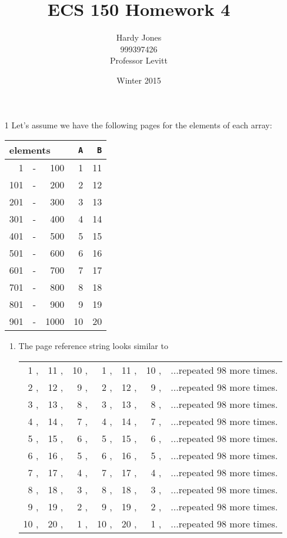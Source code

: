 \documentclass[12pt,letterpaper]{article}
\title{ECS 150 Homework 4\vspace{-2ex}}
\author{Hardy Jones\\
        999397426\\
        Professor Levitt\vspace{-2ex}}
\date{Winter 2015}
\begin{document}
  \maketitle

  \begin{enumerate}
    \item [1]
      Let's assume we have the following pages for the elements of each array:

      \begin{tabular}{r c r | r | r |}
        \multicolumn{3}{l|}{elements} & \texttt{A} & \texttt{B} \\
        \hline
        1   & - & 100  & 1          & 11 \\
        \hline
        101 & - & 200  & 2          & 12 \\
        \hline
        201 & - & 300  & 3          & 13 \\
        \hline
        301 & - & 400  & 4          & 14 \\
        \hline
        401 & - & 500  & 5          & 15 \\
        \hline
        501 & - & 600  & 6          & 16 \\
        \hline
        601 & - & 700  & 7          & 17 \\
        \hline
        701 & - & 800  & 8          & 18 \\
        \hline
        801 & - & 900  & 9          & 19 \\
        \hline
        901 & - & 1000 & 10         & 20 \\
        \hline
      \end{tabular}

      \begin{enumerate}
        \item The page reference string looks similar to

          \begin{tabular}{r r r r r r p{5cm}}
            1  ,& 11 ,& 10 ,& 1  ,& 11 ,& 10 ,& ...repeated 98 more times. \\
            2  ,& 12 ,& 9  ,& 2  ,& 12 ,& 9  ,& ...repeated 98 more times. \\
            3  ,& 13 ,& 8  ,& 3  ,& 13 ,& 8  ,& ...repeated 98 more times. \\
            4  ,& 14 ,& 7  ,& 4  ,& 14 ,& 7  ,& ...repeated 98 more times. \\
            5  ,& 15 ,& 6  ,& 5  ,& 15 ,& 6  ,& ...repeated 98 more times. \\
            6  ,& 16 ,& 5  ,& 6  ,& 16 ,& 5  ,& ...repeated 98 more times. \\
            7  ,& 17 ,& 4  ,& 7  ,& 17 ,& 4  ,& ...repeated 98 more times. \\
            8  ,& 18 ,& 3  ,& 8  ,& 18 ,& 3  ,& ...repeated 98 more times. \\
            9  ,& 19 ,& 2  ,& 9  ,& 19 ,& 2  ,& ...repeated 98 more times. \\
            10 ,& 20 ,& 1  ,& 10 ,& 20 ,& 1  ,& ...repeated 98 more times. \\
          \end{tabular}


\end{enumerate}
\end{enumerate}
\end{document}
